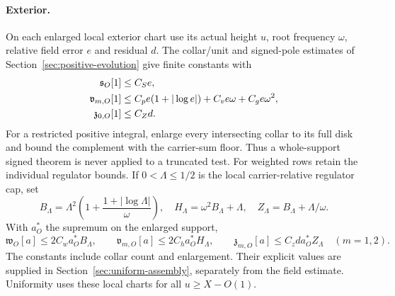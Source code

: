 \paragraph{Exterior.}
On each enlarged local exterior chart use its actual height $u$, root
frequency $\omega$, relative field error $e$ and residual $d$.
The collar/unit and signed-pole estimates of
Section~\ref{sec:positive-evolution} give finite constants with
\begin{align}
 \mathfrak s_O[1]&\le C_Se,\notag\\
 \mathfrak v_{m,O}[1]&\le C_pe(1+|\log e|)+C_ve\omega+C_ge\omega^2,\notag\\
 \mathfrak z_{0,O}[1]&\le C_Zd.
 \label{eq:sj-exterior}
\end{align}
For a restricted positive integral, enlarge every intersecting collar
to its full disk and bound the complement with the carrier-sum floor.
Thus a whole-support signed theorem is never applied to a truncated test.
For weighted rows retain the individual regulator bounds. If
$0<\Lambda\le1/2$ is the local carrier-relative regulator cap, set
\[
 B_\Lambda=\Lambda^2\left(1+\frac{1+|\log\Lambda|}{\omega}\right),
 \quad H_\Lambda=\omega^2B_\Lambda+\Lambda,
 \quad Z_\Lambda=B_\Lambda+\Lambda/\omega.
\]
With $a_O^*$ the supremum on the enlarged support,
\begin{equation}
 \mathfrak w_O[a]\le2C_wa_O^*B_\Lambda,\qquad
 \mathfrak v_{m,O}[a]\le2C_ha_O^*H_\Lambda,\qquad
 \mathfrak z_{m,O}[a]\le C_zd a_O^*Z_\Lambda\quad(m=1,2).
 \label{eq:sj-weighted}
\end{equation}
The constants include collar count and enlargement. Their explicit
values are supplied in Section~\ref{sec:uniform-assembly}, separately
from the field estimate.
Uniformity uses these local charts for all $u\ge X-O(1)$.

